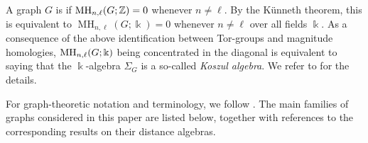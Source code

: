 \documentclass[a4paper,leqno]{amsart}
\begin{document}
A graph $G$ is  if $\operatorname{MH}_{n,\ell}(G;\mathbb{Z})=0$ whenever $n\neq \ell$.
By the K\"{u}nneth theorem, this is equivalent to $\operatorname{MH}_{n,\ell}(G;\Bbbk)=0$ whenever $n\neq\ell$ over all fields $\Bbbk$.
As a consequence of the above identification between Tor-groups and magnitude homologies, $\operatorname{MH}_{n,\ell}(G;\Bbbk)$ being concentrated in the diagonal is equivalent to saying that the $\Bbbk$-algebra $\Sigma_G$ is a so-called \emph{Koszul algebra}.  We refer to \cite{IM24} for the details.


For graph-theoretic notation and terminology, we follow
\cite{BM08,HIK11}. The main families of graphs considered in this paper are listed below, together with references to the corresponding results on their distance algebras.
\end{document}
